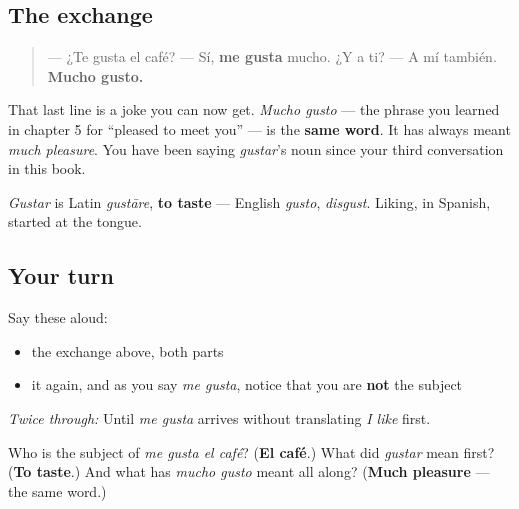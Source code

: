 \subsection*{The exchange}
\begin{quote}
— ¿Te gusta el café? — Sí, \textbf{me gusta} mucho. ¿Y a ti? — A mí también. \textbf{Mucho gusto.}
\end{quote}

That last line is a joke you can now get. \emph{Mucho gusto} — the phrase you learned in chapter 5 for \textquotedblleft{}pleased to meet you\textquotedblright{} — is the \textbf{same word}. It has always meant \emph{much pleasure}. You have been saying \emph{gustar}'s noun since your third conversation in this book.

\begin{grammarlens}[title={What you've built}]
\emph{Gustar} is Latin \emph{gustāre}, \textbf{to taste} — English \emph{gusto}, \emph{disgust}. Liking, in Spanish, started at the tongue.
\end{grammarlens}

\subsection*{Your turn}
Say these aloud:

\begin{itemize}
\raggedright
  \item the exchange above, both parts
  \item it again, and as you say \emph{me gusta}, notice that you are \textbf{not} the subject
\end{itemize}

\emph{Twice through:} Until \emph{me gusta} arrives without translating \emph{I like} first.

\begin{tcolorbox}[breakable,colback=teal!4,colframe=teal!35!black,title={Before you move on}]
Who is the subject of \emph{me gusta el café}? (\textbf{El café}.) What did \emph{gustar} mean first? (\textbf{To taste}.) And what has \emph{mucho gusto} meant all along? (\textbf{Much pleasure} — the same word.)
\end{tcolorbox}
